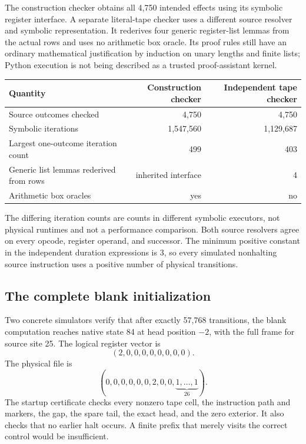 \documentclass[11pt,letterpaper]{article}
\begin{document}
The construction checker obtains all 4,750 intended effects using its
symbolic register interface. A separate literal-tape checker uses a
different source resolver and symbolic representation. It rederives four
generic register-list lemmas from the actual rows and uses no arithmetic
box oracle. Its proof rules still have an ordinary mathematical
justification by induction on unary lengths and finite lists; Python
execution is not being described as a trusted proof-assistant kernel.

\begin{center}\small
\begin{tabular}{@{}lrr@{}}
\toprule Quantity & Construction checker & Independent tape checker\\\midrule
Source outcomes checked &4,750&4,750\\
Symbolic iterations &1,547,560&1,129,687\\
Largest one-outcome iteration count &499&403\\
Generic list lemmas rederived from rows &inherited interface&4\\
Arithmetic box oracles &yes&no\\
\bottomrule
\end{tabular}
\end{center}
The differing iteration counts are counts in different symbolic
executors, not physical runtimes and not a performance comparison.
Both source resolvers agree on every opcode, register operand, and
successor. The minimum positive constant in the independent duration
expressions is 3, so every simulated nonhalting source instruction
uses a positive number of physical transitions.

\subsection{The complete blank initialization}

Two concrete simulators verify that after exactly 57,768 transitions,
the blank computation reaches native state 84 at head position $-2$,
with the full frame for source site 25. The logical register vector is
\[
                     (2,0,0,0,0,0,0,0,0).
\]
The physical file is
\[
        (0,0,0,0,0,0,2,0,0,\underbrace{1,\ldots,1}_{26}).
\]
The startup certificate checks every nonzero tape cell, the instruction
path and markers, the gap, the spare tail, the exact head, and the zero
exterior. It also checks that no earlier halt occurs. A finite prefix
that merely visits the correct control would be insufficient.
\end{document}
